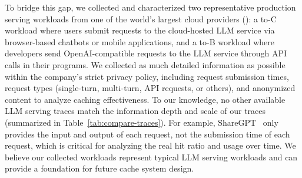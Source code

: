 To bridge this gap,
we collected and characterized two representative production serving workloads
from one of the world's largest cloud providers (\company):
a to-C workload where users submit requests to the cloud-hosted LLM service via browser-based
chatbots or mobile applications, and a to-B workload where developers
send OpenAI-compatible requests to the LLM service through API calls in their programs.
We collected as much detailed information as possible within the company's strict privacy policy,
including request submission times, request types (single-turn, multi-turn, API requests, or others),
and anonymized content to analyze caching effectiveness.
To our knowledge, no other available LLM serving traces
match the information depth and scale of our traces (summarized in Table~\ref{tab:compare-traces}).
For example, ShareGPT~\cite{sharegpt} only provides the input and output of each request,
not the submission time of each request,
which is critical for analyzing the real {\kvcache} hit ratio and usage over time.
We believe our collected workloads represent typical LLM serving workloads
and can provide a foundation for future {\kvcache} cache system design.

